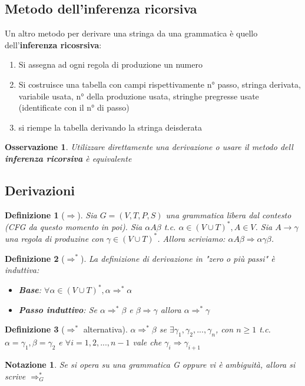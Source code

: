 \documentclass[12pt]{article}
\newtheorem{Definizione}{Definizione}[subsection]
\newtheorem{Notazione}{Notazione}[subsection]
\newtheorem{Osservazione}{Osservazione}[subsection]
\begin{document}
\subsection{Metodo dell'inferenza ricorsiva}
Un altro metodo per derivare una stringa da una grammatica è quello dell'\textbf{inferenza ricosrsiva}:
\begin{enumerate}
    \item Si assegna ad ogni regola di produzione un numero
    \item Si costruisce una tabella con campi rispettivamente n° passo, stringa derivata, variabile usata, n° della produzione usata, stringhe pregresse usate (identificate con il n° di passo)
    \item si riempe la tabella derivando la stringa deisderata
\end{enumerate}
\begin{Osservazione}
    Utilizzare direttamente una derivazione o usare il metodo dell \textbf{inferenza ricorsiva} è equivalente
\end{Osservazione}
\subsection{Derivazioni}
\begin{Definizione}[$\Rightarrow$]
Sia $G = (V, T, P, S)$ una grammatica libera dal contesto (CFG da questo momento in poi). Sia $\alpha A \beta$ t.c. $\alpha \in (V \cup T)^*, A \in V$. Sia $A \to \gamma$ una regola di produzine con $\gamma \in (V \cup T)^*$. Allora scriviamo: $\alpha A \beta \Rightarrow \alpha \gamma \beta$.
\end{Definizione}
\begin{Definizione}[$\Rightarrow^*$]
    La definizione di derivazione in "zero o più passi" è induttiva:
    \begin{itemize}
        \item \textbf{Base}: $\forall \alpha \in (V \cup T)^*, \alpha \Rightarrow^* \alpha$
        \item \textbf{Passo induttivo}: Se $\alpha \Rightarrow^* \beta$ e $\beta \Rightarrow \gamma$ allora $\alpha \Rightarrow^* \gamma$
    \end{itemize}
\end{Definizione}
\begin{Definizione}[$\Rightarrow^*$ alternativa]
    $\alpha \Rightarrow^* \beta$ se $\exists \gamma_1, \gamma_2, ..., \gamma_n$, con $n \geq 1$ t.c. \newline $\alpha = \gamma_1, \beta = \gamma_2$ e $\forall i = 1,2,...,n-1$ vale che $\gamma_i \Rightarrow \gamma_{i+1}$
\end{Definizione}
\begin{Notazione}
Se si opera su una grammatica G oppure vi è ambiguità, allora si scrive $\Rightarrow_{G}^*$
\end{Notazione}
\end{document}
